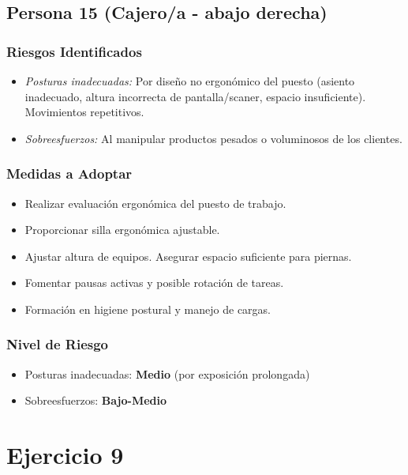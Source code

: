 \documentclass[12pt,a4paper]{article}
\begin{document}
	\bigskip\hrulefill\bigskip
	
	\subsection{Persona 15 (Cajero/a - abajo derecha)}
	
	\subsubsection{Riesgos Identificados}
	\begin{itemize}
		\item \textit{Posturas inadecuadas:} Por diseño no ergonómico del puesto (asiento inadecuado, altura incorrecta de pantalla/scaner, espacio insuficiente). Movimientos repetitivos.
		\item \textit{Sobreesfuerzos:} Al manipular productos pesados o voluminosos de los clientes.
	\end{itemize}
	
	\subsubsection{Medidas a Adoptar}
	\begin{itemize}
		\item Realizar evaluación ergonómica del puesto de trabajo.
		\item Proporcionar silla ergonómica ajustable.
		\item Ajustar altura de equipos. Asegurar espacio suficiente para piernas.
		\item Fomentar pausas activas y posible rotación de tareas.
		\item Formación en higiene postural y manejo de cargas.
	\end{itemize}
	
	\subsubsection{Nivel de Riesgo}
	\begin{itemize}
		\item Posturas inadecuadas: \textbf{Medio} (por exposición prolongada)
		\item Sobreesfuerzos: \textbf{Bajo-Medio}
	\end{itemize}
	
	\section{Ejercicio 9}
	
\end{document}
